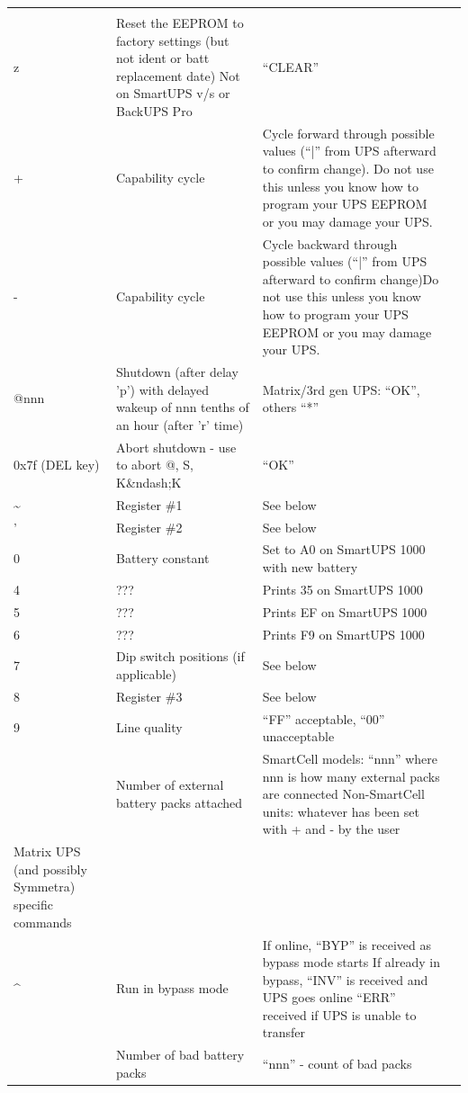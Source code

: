 \begin{longtable}{llll}
{ } \\
{z} & {Reset the EEPROM to factory settings (but not ident or batt replacement
date) Not on SmartUPS v/s or BackUPS Pro} & {``CLEAR''} & { 
 } \\
{+} & {Capability cycle} & {Cycle forward through possible values (``|'' from
UPS afterward to confirm change). Do not use this unless you know how to
program your UPS EEPROM or you may damage your UPS.} & { 
 } \\
{-} & {Capability cycle} & {Cycle backward through possible values (``|'' from
UPS afterward to confirm change)Do not use this unless you know how to program
your UPS EEPROM or you may damage your UPS.} & { 
 } \\
{@nnn} & {Shutdown (after delay 'p') with delayed wakeup of nnn tenths of an
hour (after 'r' time)} & {Matrix/3rd gen UPS: ``OK'', others ``*''} & { 
 } \\
{0x7f (DEL key)} & {Abort shutdown - use to abort @, S, K\&ndash;K} & {``OK''}
& { 
 } \\
{\~{}} & {Register \#1} & {See below} & { 
 } \\
{'} & {Register \#2} & {See below} & { 
 } \\
{0} & {Battery constant} & {Set to A0 on SmartUPS 1000 with new battery} & { 
 } \\
{4} & {???} & {Prints 35 on SmartUPS 1000} & { 
 } \\
{5} & {???} & {Prints EF on SmartUPS 1000} & { 
 } \\
{6} & {???} & {Prints F9 on SmartUPS 1000} & { 
 } \\
{7} & {Dip switch positions (if applicable)} & {See below} & { 
 } \\
{8} & {Register \#3} & {See below} & { 
 } \\
{9} & {Line quality} & {``FF'' acceptable, ``00'' unacceptable} & { 
 } \\
{\gt{}} & {Number of external battery packs attached} & {SmartCell models:
``nnn'' where nnn is how many external packs are connected Non-SmartCell
units: whatever has been set with \gt{}+ and \gt{}- by the user} & { 
 } \\
{Matrix UPS (and possibly Symmetra) specific commands} & { 
 } & &  { } \\
{\^{}} & {Run in bypass mode} & {If online, ``BYP'' is received as bypass mode
starts If already in bypass, ``INV'' is received and UPS goes online ``ERR''
received if UPS is unable to transfer} & { 
 } \\
{\lt{}} & {Number of bad battery packs} & {``nnn'' - count of bad packs
}
\end{longtable}
